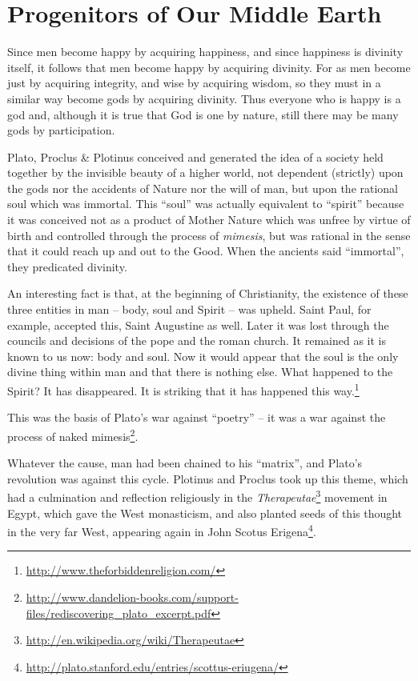 \section{Progenitors of Our Middle Earth}

\begin{quotex}
Since men become happy by acquiring happiness, and since happiness is divinity itself, it follows that men become happy by acquiring divinity. For as men become just by acquiring integrity, and wise by acquiring wisdom, so they must in a similar way become gods by acquiring divinity. Thus everyone who is happy is a god and, although it is true that God is one by nature, still there may be many gods by participation.
\end{quotex}


Plato, Proclus \& Plotinus conceived and generated the idea of a society held together by the invisible beauty of a higher world, not dependent (strictly) upon the gods nor the accidents of Nature nor the will of man, but upon the rational soul which was immortal. This ``soul'' was actually equivalent to ``spirit'' because it was conceived not as a product of Mother Nature which was unfree by virtue of birth and controlled through the process of \emph{mimesis}, but was rational in the sense that it could reach up and out to the Good. When the ancients said ``immortal'', they predicated divinity.

\begin{quotex}
An interesting fact is that, at the beginning of Christianity, the existence of these three entities in man -- body, soul and Spirit -- was upheld. Saint Paul, for example, accepted this, Saint Augustine as well. Later it was lost through the councils and decisions of the pope and the roman church. It remained as it is known to us now: body and soul. Now it would appear that the soul is the only divine thing within man and that there is nothing else. What happened to the Spirit? It has disappeared. It is striking that it has happened this way.\footnote{\url{http://www.theforbiddenreligion.com/}}
\end{quotex}

This was the basis of Plato's war against ``poetry'' -- it was a war against the process of naked mimesis\footnote{\url{http://www.dandelion-books.com/support-files/rediscovering_plato_excerpt.pdf}}.

Whatever the cause, man had been chained to his ``matrix'', and Plato's revolution was against this cycle. Plotinus and Proclus took up this theme, which had a culmination and reflection religiously in the \emph{Therapeutae}\footnote{\url{http://en.wikipedia.org/wiki/Therapeutae}} movement in Egypt, which gave the West monasticism, and also planted seeds of this thought in the very far West, appearing again in John Scotus Erigena\footnote{\url{http://plato.stanford.edu/entries/scottus-eriugena/}}.

